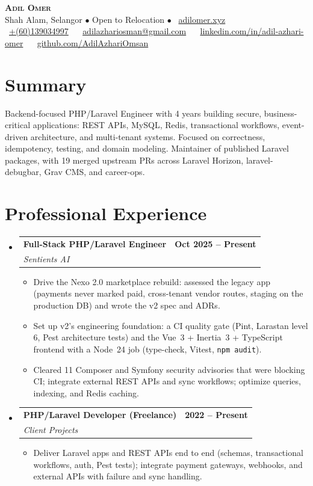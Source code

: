 \documentclass[letterpaper,10pt]{article}
\makeatletter
\newcommand{\resumeItem}[1]{\item\small{{#1 \vspace{-2pt}}}}
\newcommand{\resumeSubheading}[4]{
  \vspace{-2pt}\item
    \begin{tabular*}{0.97\textwidth}[t]{l@{\extracolsep{\fill}}r}
      \textbf{#1} & \textbf{\small #2} \\
      \textit{\small#3} & \textit{\small #4} \\
    \end{tabular*}\vspace{-7pt}
}
\newcommand{\resumeSubHeadingListStart}{\begin{itemize}[leftmargin=0.15in, label={}]}
\newcommand{\resumeSubHeadingListEnd}{\end{itemize}}
\newcommand{\resumeItemListStart}{\begin{itemize}[label=--]}
\newcommand{\resumeItemListEnd}{\end{itemize}\vspace{-5pt}}
\makeatother
\begin{document}
\begin{center}
    \textbf{\Huge \scshape Adil Omer} \\ \vspace{1pt}
    \small Shah Alam, Selangor $\bullet$ Open to Relocation $\bullet$ \faGlobe\ \href{https://adilomer.xyz}{adilomer.xyz} \\ \vspace{1pt}
    \small \faPhone\ \href{tel:+60139034997}{+(60)139034997} ~
    \faEnvelope\ \href{mailto:adilazhariosman@gmail.com}{adilazhariosman@gmail.com} ~
    \faLinkedin\ \href{https://linkedin.com/in/adil-azhari-omer}{linkedin.com/in/adil-azhari-omer} ~
    \faGithub\ \href{https://github.com/AdilAzhariOmsan}{github.com/AdilAzhariOmsan}
\end{center}

\section{Summary}
\small{Backend-focused PHP/Laravel Engineer with 4 years building secure, business-critical applications: REST APIs, MySQL, Redis, transactional workflows, event-driven architecture, and multi-tenant systems. Focused on correctness, idempotency, testing, and domain modeling. Maintainer of published Laravel packages, with 19 merged upstream PRs across Laravel Horizon, laravel-debugbar, Grav CMS, and career-ops.}

\section{Professional Experience}
  \resumeSubHeadingListStart
    \resumeSubheading
      {Full-Stack PHP/Laravel Engineer}{Oct 2025 -- Present}
      {Sentients AI}{}
      \resumeItemListStart
        \resumeItem{Drive the Nexo 2.0 marketplace rebuild: assessed the legacy app (payments never marked paid, cross-tenant vendor routes, staging on the production DB) and wrote the v2 spec and ADRs.}
        \resumeItem{Set up v2's engineering foundation: a CI quality gate (Pint, Larastan level 6, Pest architecture tests) and the Vue~3 + Inertia~3 + TypeScript frontend with a Node~24 job (type-check, Vitest, \texttt{npm audit}).}
        \resumeItem{Cleared 11 Composer and Symfony security advisories that were blocking CI; integrate external REST APIs and sync workflows; optimize queries, indexing, and Redis caching.}
      \resumeItemListEnd

    \resumeSubheading
      {PHP/Laravel Developer (Freelance)}{2022 -- Present}
      {Client Projects}{}
      \resumeItemListStart
        \resumeItem{Deliver Laravel apps and REST APIs end to end (schemas, transactional workflows, auth, Pest tests); integrate payment gateways, webhooks, and external APIs with failure and sync handling.}
      \resumeItemListEnd
  \resumeSubHeadingListEnd
\end{document}
